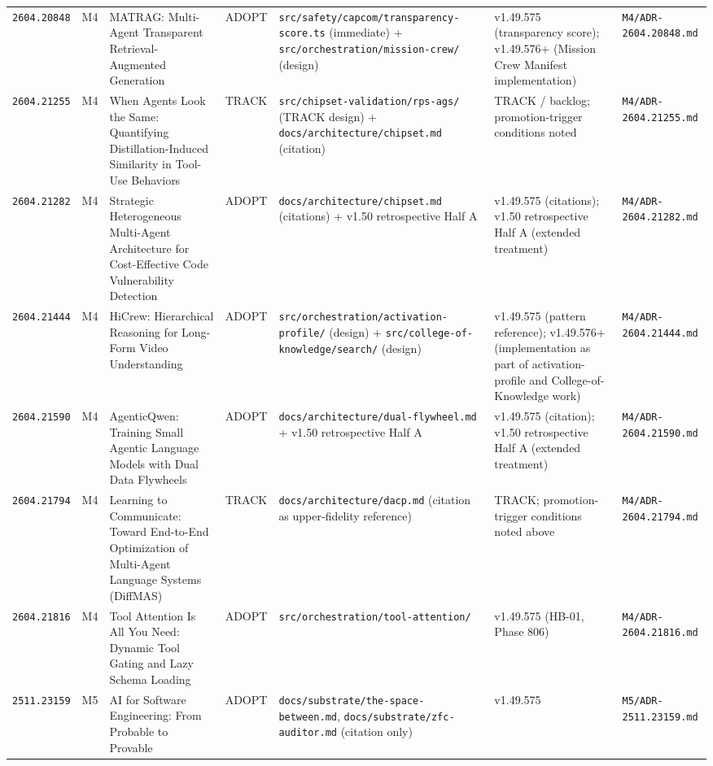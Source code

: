 \documentclass[11pt,letterpaper]{article}
\newcommand{\arxivid}[1]{\texttt{\textcolor{accent}{#1}}}
\begin{document}
\begin{footnotesize}
\begin{longtable}{@{}L{0.10\textwidth} L{0.025\textwidth} L{0.22\textwidth} L{0.06\textwidth} L{0.20\textwidth} L{0.13\textwidth} L{0.13\textwidth}@{}}
\arxivid{2604.20848} & M4 & MATRAG: Multi-Agent Transparent Retrieval-Augmented Generation & ADOPT & \texttt{src/safety/capcom/transparency-score.ts} (immediate) + \texttt{src/orchestration/mission-crew/} (design) & v1.49.575 (transparency score); v1.49.576+ (Mission Crew Manifest implementation) & \texttt{\small M4/ADR-2604.20848.md} \\
\arxivid{2604.21255} & M4 & When Agents Look the Same: Quantifying Distillation-Induced Similarity in Tool-Use Behaviors & TRACK & \texttt{src/chipset-validation/rps-ags/} (TRACK design) + \texttt{docs/architecture/chipset.md} (citation) & TRACK / backlog; promotion-trigger conditions noted & \texttt{\small M4/ADR-2604.21255.md} \\
\arxivid{2604.21282} & M4 & Strategic Heterogeneous Multi-Agent Architecture for Cost-Effective Code Vulnerability Detection & ADOPT & \texttt{docs/architecture/chipset.md} (citations) + v1.50 retrospective Half A & v1.49.575 (citations); v1.50 retrospective Half A (extended treatment) & \texttt{\small M4/ADR-2604.21282.md} \\
\arxivid{2604.21444} & M4 & HiCrew: Hierarchical Reasoning for Long-Form Video Understanding & ADOPT & \texttt{src/orchestration/activation-profile/} (design) + \texttt{src/college-of-knowledge/search/} (design) & v1.49.575 (pattern reference); v1.49.576+ (implementation as part of activation-profile and College-of-Knowledge work) & \texttt{\small M4/ADR-2604.21444.md} \\
\arxivid{2604.21590} & M4 & AgenticQwen: Training Small Agentic Language Models with Dual Data Flywheels & ADOPT & \texttt{docs/architecture/dual-flywheel.md} + v1.50 retrospective Half A & v1.49.575 (citation); v1.50 retrospective Half A (extended treatment) & \texttt{\small M4/ADR-2604.21590.md} \\
\arxivid{2604.21794} & M4 & Learning to Communicate: Toward End-to-End Optimization of Multi-Agent Language Systems (DiffMAS) & TRACK & \texttt{docs/architecture/dacp.md} (citation as upper-fidelity reference) & TRACK; promotion-trigger conditions noted above & \texttt{\small M4/ADR-2604.21794.md} \\
\arxivid{2604.21816} & M4 & Tool Attention Is All You Need: Dynamic Tool Gating and Lazy Schema Loading & ADOPT & \texttt{src/orchestration/tool-attention/} & v1.49.575 (HB-01, Phase 806) & \texttt{\small M4/ADR-2604.21816.md} \\
\arxivid{2511.23159} & M5 & AI for Software Engineering: From Probable to Provable & ADOPT & \texttt{docs/substrate/the-space-between.md}, \texttt{docs/substrate/zfc-auditor.md} (citation only) & v1.49.575 & \texttt{\small M5/ADR-2511.23159.md} \\

\end{longtable}
\end{footnotesize}
\end{document}
